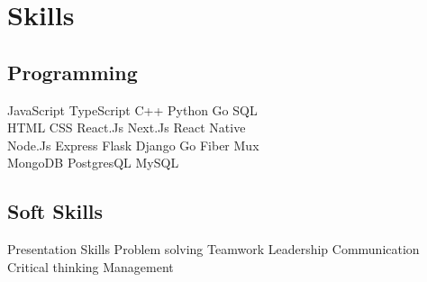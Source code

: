 \documentclass[]{deedy-resume-openfont}
\begin{document}
\begin{minipage}[t]{0.33\textwidth}

\section{Skills}
\subsection{Programming}
JavaScript \textbullet{} TypeScript \textbullet{} C++
\textbullet{} Python \textbullet{} Go \textbullet{} SQL \\
HTML \textbullet{} CSS \textbullet{} React.Js \textbullet{}
Next.Js \textbullet{} React Native \\
Node.Js \textbullet{} Express \textbullet{} Flask \textbullet{} Django \textbullet{}
Go Fiber \textbullet{} Mux \\
MongoDB \textbullet{} PostgresQL \textbullet{} MySQL \\
\sectionsep

\subsection{Soft Skills}
Presentation Skills \textbullet{} Problem solving \textbullet{} 
Teamwork \textbullet{} Leadership \textbullet{} Communication
\textbullet{} Critical thinking \textbullet{} Management \\

%
%

\end{minipage} 
\hfill
\end{document}
